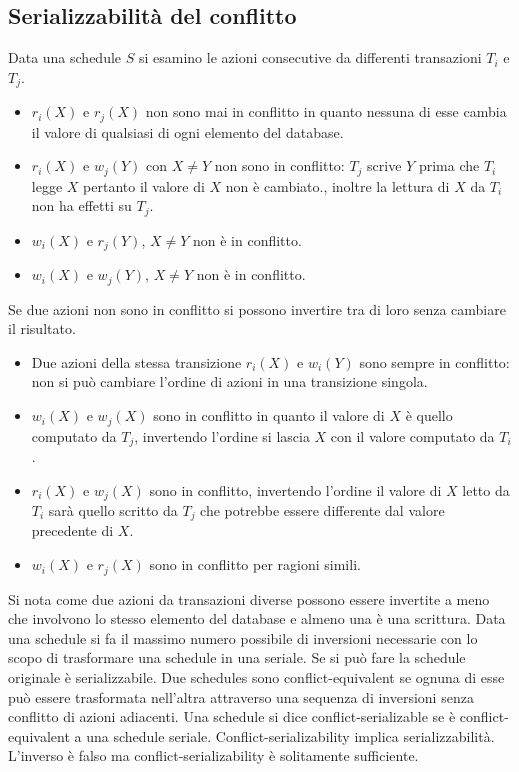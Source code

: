 \subsection{Serializzabilit\`a del conflitto}
Data una schedule $S$ si esamino le azioni consecutive da differenti transazioni $T_i$ e $T_j$.
\begin{itemize}
\item $r_i(X)$ e $r_j(X)$ non sono mai in conflitto in quanto nessuna di esse cambia il valore di qualsiasi di ogni elemento del database.
\item $r_i(X)$ e $w_j(Y)$ con $X\neq Y$ non sono in conflitto: $T_j$ scrive $Y$ prima che $T_i$ legge $X$ pertanto il valore di $X$ non \`e cambiato., inoltre la lettura di $X$ da $T_i$ non ha effetti su $T_j$.
\item $w_i(X)$ e $r_j(Y)$, $X\neq Y$ non \`e in conflitto.
\item $w_i(X)$ e $w_j(Y)$, $X\neq Y$ non \`e in conflitto.
\end{itemize}
Se due azioni non sono in conflitto si possono invertire tra di loro senza cambiare il risultato.
\begin{itemize}
\item Due azioni della stessa transizione $r_i(X)$ e $w_i(Y)$ sono sempre in conflitto: non si pu\`o cambiare l'ordine di azioni in una transizione singola.
\item $w_i(X)$ e $w_j(X)$ sono in conflitto in quanto il valore di $X$ \`e quello computato da $T_j$, invertendo l'ordine si lascia $X$ con il valore computato da $T_i$.
\item $r_i(X)$ e $w_j(X)$ sono in conflitto, invertendo l'ordine il valore di $X$ letto da $T_i$ sar\`a quello scritto da $T_j$ che potrebbe essere differente dal valore precedente di $X$.
\item $w_i(X)$ e $r_j(X)$ sono in conflitto per ragioni simili.
\end{itemize}
Si nota come due azioni da transazioni diverse possono essere invertite a meno che involvono lo stesso elemento del database e almeno una \`e una scrittura. Data una schedule si fa il massimo numero possibile
di inversioni necessarie con lo scopo di trasformare una schedule in una seriale. Se si pu\`o fare la schedule originale \`e serializzabile. Due schedules sono conflict-equivalent se ognuna di esse pu\`o essere
trasformata nell'altra attraverso una sequenza di inversioni senza conflitto di azioni adiacenti. Una schedule si dice conflict-serializable se \`e conflict-equivalent a una schedule seriale. Conflict-serializability 
implica serializzabilit\`a. L'inverso \`e falso ma conflict-serializability \`e solitamente sufficiente. 
